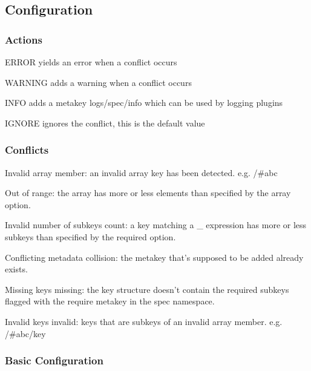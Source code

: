 \subsection*{Configuration}

\subsubsection*{Actions}


\begin{DoxyItemize}
\item {\ttfamily E\+R\+R\+O\+R} yields an error when a conflict occurs
\item {\ttfamily W\+A\+R\+N\+I\+N\+G} adds a warning when a conflict occurs
\item {\ttfamily I\+N\+F\+O} adds a metakey {\ttfamily logs/spec/info} which can be used by logging plugins
\item {\ttfamily I\+G\+N\+O\+R\+E} ignores the conflict, this is the default value
\end{DoxyItemize}

\subsubsection*{Conflicts}


\begin{DoxyItemize}
\item Invalid array {\ttfamily member}\+: an invalid array key has been detected. e.\+g. {\ttfamily /\#abc}
\item Out of {\ttfamily range}\+: the array has more or less elements than specified by the {\ttfamily array} option.
\item Invalid number of subkeys {\ttfamily count}\+: a key matching a {\ttfamily \+\_\+} expression has more or less subkeys than specified by the {\ttfamily required} option.
\item Conflicting metadata {\ttfamily collision}\+: the metakey that's supposed to be added already exists.
\item Missing keys {\ttfamily missing}\+: the key structure doesn't contain the required subkeys flagged with the {\ttfamily require} metakey in the {\ttfamily spec} namespace.
\item Invalid keys {\ttfamily invalid}\+: keys that are subkeys of an invalid array member. e.\+g. {\ttfamily /\#abc/key}
\end{DoxyItemize}

\subsubsection*{Basic Configuration}

